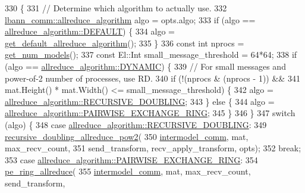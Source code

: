 \begin{DoxyCode}
330                                           \{
331   \textcolor{comment}{// Determine which algorithm to actually use.}
332   \hyperlink{classlbann_1_1lbann__comm_a02a03227cc27e3516f0d9f9812f32019}{lbann\_comm::allreduce\_algorithm} algo = opts.algo;
333   \textcolor{keywordflow}{if} (algo == \hyperlink{classlbann_1_1lbann__comm_a02a03227cc27e3516f0d9f9812f32019a5b39c8b553c821e7cddc6da64b5bd2ee}{allreduce\_algorithm::DEFAULT}) \{
334     algo = \hyperlink{classlbann_1_1lbann__comm_aafcb505629dd550ebd0b2c41792aca27}{get\_default\_allreduce\_algorithm}();
335   \}
336   \textcolor{keyword}{const} \textcolor{keywordtype}{int} nprocs = \hyperlink{classlbann_1_1lbann__comm_aeb8ef8f13bbb324e3e1f656998198f3f}{get\_num\_models}();
337   \textcolor{keyword}{const} El::Int small\_message\_threshold = 64*64;
338   \textcolor{keywordflow}{if} (algo == \hyperlink{classlbann_1_1lbann__comm_a02a03227cc27e3516f0d9f9812f32019a0fcc90da4811c877ba9f9c12f7d60bc9}{allreduce\_algorithm::DYNAMIC}) \{
339     \textcolor{comment}{// For small messages and power-of-2 number of processes, use RD.}
340     \textcolor{keywordflow}{if} (!(nprocs & (nprocs - 1)) &&
341         mat.Height() * mat.Width() <= small\_message\_threshold) \{
342       algo = \hyperlink{classlbann_1_1lbann__comm_a02a03227cc27e3516f0d9f9812f32019a5a99a7b378e450d9e91b10b1f0085274}{allreduce\_algorithm::RECURSIVE\_DOUBLING};
343     \} \textcolor{keywordflow}{else} \{
344       algo = \hyperlink{classlbann_1_1lbann__comm_a02a03227cc27e3516f0d9f9812f32019ae97d669b6498b36d1ce07b3d2c544fee}{allreduce\_algorithm::PAIRWISE\_EXCHANGE\_RING};
345     \}
346   \}
347   \textcolor{keywordflow}{switch} (algo) \{
348   \textcolor{keywordflow}{case} \hyperlink{classlbann_1_1lbann__comm_a02a03227cc27e3516f0d9f9812f32019a5a99a7b378e450d9e91b10b1f0085274}{allreduce\_algorithm::RECURSIVE\_DOUBLING}:
349     \hyperlink{classlbann_1_1lbann__comm_a99bc2f8128f0b0e2ebdf876a3a343635}{recursive\_doubling\_allreduce\_pow2}(
350       \hyperlink{classlbann_1_1lbann__comm_a2c51c5d8faf4f0ab4f43b892c55e597b}{intermodel\_comm}, mat, max\_recv\_count,
351       send\_transform, recv\_apply\_transform, opts);
352     \textcolor{keywordflow}{break};
353   \textcolor{keywordflow}{case} \hyperlink{classlbann_1_1lbann__comm_a02a03227cc27e3516f0d9f9812f32019ae97d669b6498b36d1ce07b3d2c544fee}{allreduce\_algorithm::PAIRWISE\_EXCHANGE\_RING}:
354     \hyperlink{classlbann_1_1lbann__comm_ac294fe5fa47f283aba31fa1abfa99438}{pe\_ring\_allreduce}(
355       \hyperlink{classlbann_1_1lbann__comm_a2c51c5d8faf4f0ab4f43b892c55e597b}{intermodel\_comm}, mat, max\_recv\_count, send\_transform,

\end{DoxyCode}
